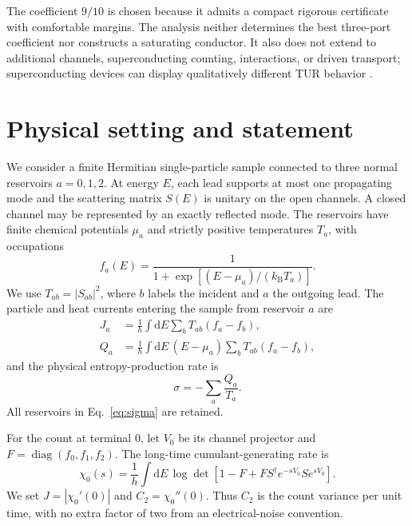 \documentclass[aps,pra,reprint,superscriptaddress,nofootinbib,longbibliography,floatfix]{revtex4-2}
\newcommand{\kb}{k_{\mathrm B}}
\newcommand{\dd}{\mathrm d}
\begin{document}
The coefficient $9/10$ is chosen because it admits a compact rigorous certificate with comfortable margins.  The analysis neither determines the best three-port coefficient nor constructs a saturating conductor.  It also does not extend to additional channels, superconducting counting, interactions, or driven transport; superconducting devices can display qualitatively different TUR behavior \cite{Mayo2026}.

\section{Physical setting and statement}
\label{sec:model}

We consider a finite Hermitian single-particle sample connected to three normal reservoirs $a=0,1,2$.  At energy $E$, each lead supports at most one propagating mode and the scattering matrix $S(E)$ is unitary on the open channels.  A closed channel may be represented by an exactly reflected mode.  The reservoirs have finite chemical potentials $\mu_a$ and strictly positive temperatures $T_a$, with occupations
\begin{equation}
 f_a(E)=\frac{1}{1+\exp[(E-\mu_a)/(\kb T_a)]}.
 \label{eq:fermi}
\end{equation}
We use $T_{ab}=|S_{ab}|^2$, where $b$ labels the incident and $a$ the outgoing lead.  The particle and heat currents entering the sample from reservoir $a$ are
\begin{align}
 J_a&=\frac{1}{h}\int\dd E\sum_bT_{ab}(f_a-f_b),\label{eq:curr}\\
 Q_a&=\frac{1}{h}\int\dd E\,(E-\mu_a)\sum_bT_{ab}(f_a-f_b),\label{eq:heat}
\end{align}
and the physical entropy-production rate is
\begin{equation}
 \sigma=-\sum_a\frac{Q_a}{T_a}.
 \label{eq:sigma}
\end{equation}
All reservoirs in Eq.~\eqref{eq:sigma} are retained.

For the count at terminal 0, let $V_0$ be its channel projector and $F=\operatorname{diag}(f_0,f_1,f_2)$.  The long-time cumulant-generating rate is \cite{LevitovLesovik1993,BrandnerSaito2025JPA}
\begin{equation}
 \chi_0(s)=\frac{1}{h}\int\dd E\,
 \log\det[1-F+F S^\dagger e^{-sV_0}S e^{sV_0}].
 \label{eq:cgf}
\end{equation}
We set $J=|\chi_0'(0)|$ and $C_2=\chi_0''(0)$.  Thus $C_2$ is the count variance per unit time, with no extra factor of two from an electrical-noise convention.
\end{document}
